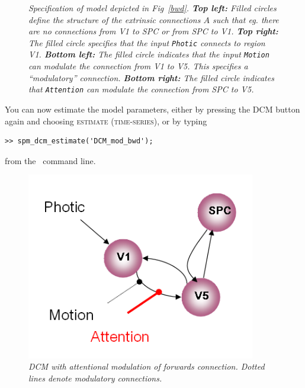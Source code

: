 \begin{figure}
\begin{center}
\caption{\em Specification of model depicted in Fig~\ref{bwd}. \textbf{Top left:} Filled circles define the structure of the extrinsic connections $A$ such that eg. there are no connections from V1 to SPC or from SPC to V1. \textbf{Top right:} The filled circle specifies that the input \texttt{Photic} connects to region V1. \textbf{Bottom left:} The filled circle indicates that the input \texttt{Motion} can modulate the connection from V1 to V5. This specifies a ``modulatory'' connection. \textbf{Bottom right:} The filled circle indicates that \texttt{Attention} can modulate the connection from SPC to V5. \label{dcm_fig4}}
\end{center}
\end{figure}

You can now estimate the model parameters, either by pressing the DCM button again and choosing \textsc{estimate (time-series)}, or by typing
\begin{verbatim}
>> spm_dcm_estimate('DCM_mod_bwd');
\end{verbatim}
from the \matlab\ command line.

\begin{figure}
\begin{center}
\includegraphics[width=100mm]{dcm/dcm_mod_fwd}
\caption{\em DCM with attentional modulation of forwards connection. Dotted lines denote modulatory connections.\label{fwd}}
\end{center}
\end{figure}

